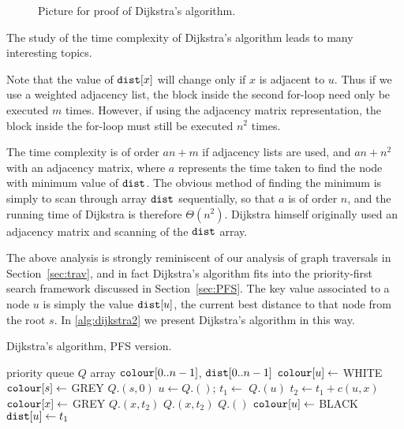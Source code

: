 \begin{figure}
\caption{Picture for proof of Dijkstra's algorithm.}
\label{fig:dijk-proof2}
\end{figure}

The study of the time complexity of Dijkstra's algorithm leads to many
interesting topics.

Note that the value of $\dist[x]$ will change only if $x$ is adjacent to
$u$. Thus if we use a weighted adjacency list, the block inside the
second for-loop need only be executed $m$ times. However, if
using the adjacency matrix representation, the block inside the for-loop
must still be executed $n^2$ times.

The time complexity is of order $a n + m$ if adjacency lists are used,
and $a n + n^2$ with an adjacency matrix, where $a$ represents the time
taken to find the node with minimum value of $\dist$. The obvious method
of finding the minimum is simply to scan through array $\dist$
sequentially, so that $a$ is of order $n$, and the running time of
Dijkstra is therefore $\Theta(n^2)$. Dijkstra himself originally used
an adjacency matrix and scanning of the $\dist$ array. 

The above analysis is strongly reminiscent of our analysis of graph
traversals in Section~\ref{sec:trav}, and in fact Dijkstra's algorithm fits
into the priority-first search framework discussed in
Section~\ref{sec:PFS}. The key value associated to a node $u$ is simply the
value $\dist[u]$, the current best distance to that node from the root $s$.
In \cref{alg:dijkstra2} we present Dijkstra's algorithm in this
way.


\begin{algorithm}[H]
  \caption{Dijkstra's algorithm, PFS version.}
  \label{alg:dijkstra2}
\begin{algorithmic}[1]
	\State priority queue $Q$
	\State array $\colour[0..n-1]$, $\dist[0..n-1]$
		\State $\colour[u] \gets$ WHITE 
	\EndFor
	\State $\colour[s] \gets $ GREY
	\State $Q$.$(s, 0)$
		\State $u \gets Q$.$()$; $t_1 \gets$  $Q$.$(u)$
			\State $t_2 \gets t_1 + c(u, x)$
				\State $\colour[x] \gets $ GREY
				\State $Q$.$(x, t_2)$
				\State $Q$.$(x, t_2)$
			\EndIf
		\EndFor
		\State $Q$.$()$
		\State $\colour[u] \gets $ BLACK
		\State $\dist[u] \gets t_1$ 
	\EndWhile
	\State \Return{$\dist$}
\EndFunction
\end{algorithmic}
\end{algorithm}


